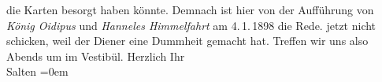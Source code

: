 \begin{ledgroupsized}[t]{13cm}
{{{                  die Karten besorgt haben könnte. Demnach ist hier von der Aufführung von \emph{König Oidipus} und \emph{Hanneles Himmelfahrt} am 4. 1. 1898 die Rede. }}}\label{K_L03278-1h} jetzt nicht
               schicken, weil der Diener eine Dummheit gemacht hat. Treffen wir uns also
                  Abends um \label{K_L03278-2v}\label{K_L03278-2h} im Vestibül.\pend
           \pstart
           Herzlich Ihr {\\[\baselineskip]}\spacefill\mbox{Salten}\pend
           \leftskip=0em{}
         
         \endnumbering{}\end{ledgroupsized}  \newcommand{\dateiname}{L03278}\newcommand{\titel}{Felix Salten an Arthur Schnitzler, [4. 1.? 1898]}\newcommand{\editorInnen}{Martin Anton Müller und Laura Untner}
      